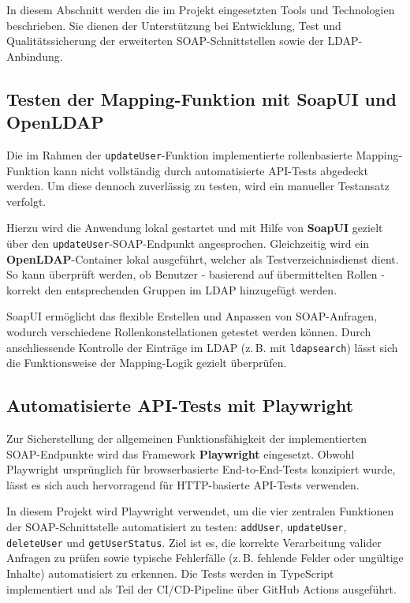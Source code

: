 In diesem Abschnitt werden die im Projekt eingesetzten Tools und Technologien beschrieben. Sie dienen der Unterstützung bei Entwicklung, Test und Qualitätssicherung der erweiterten SOAP-Schnittstellen sowie der LDAP-Anbindung.

\subsection{Testen der Mapping-Funktion mit SoapUI und OpenLDAP}

Die im Rahmen der \texttt{updateUser}-Funktion implementierte rollenbasierte Mapping-Funktion kann nicht vollständig durch automatisierte API-Tests abgedeckt werden. Um diese dennoch zuverlässig zu testen, wird ein manueller Testansatz verfolgt.

Hierzu wird die Anwendung lokal gestartet und mit Hilfe von \textbf{SoapUI} gezielt über den \texttt{updateUser}-SOAP-Endpunkt angesprochen. Gleichzeitig wird ein \textbf{OpenLDAP}-Container lokal ausgeführt, welcher als Testverzeichnisdienst dient. So kann überprüft werden, ob Benutzer - basierend auf übermittelten Rollen - korrekt den entsprechenden Gruppen im LDAP hinzugefügt werden.

SoapUI ermöglicht das flexible Erstellen und Anpassen von SOAP-Anfragen, wodurch verschiedene Rollenkonstellationen getestet werden können. Durch anschliessende Kontrolle der Einträge im LDAP (z.\,B. mit \texttt{ldapsearch}) lässt sich die Funktionsweise der Mapping-Logik gezielt überprüfen.

\subsection{Automatisierte API-Tests mit Playwright}

Zur Sicherstellung der allgemeinen Funktionsfähigkeit der implementierten SOAP-Endpunkte wird das Framework \textbf{Playwright} eingesetzt. Obwohl Playwright ursprünglich für browserbasierte End-to-End-Tests konzipiert wurde, lässt es sich auch hervorragend für HTTP-basierte API-Tests verwenden. 

In diesem Projekt wird Playwright verwendet, um die vier zentralen Funktionen der SOAP-Schnittstelle automatisiert zu testen: \texttt{addUser}, \texttt{updateUser}, \texttt{deleteUser} und \texttt{getUserStatus}. Ziel ist es, die korrekte Verarbeitung valider Anfragen zu prüfen sowie typische Fehlerfälle (z.\,B. fehlende Felder oder ungültige Inhalte) automatisiert zu erkennen. Die Tests werden in TypeScript implementiert und als Teil der CI/CD-Pipeline über GitHub Actions ausgeführt.

